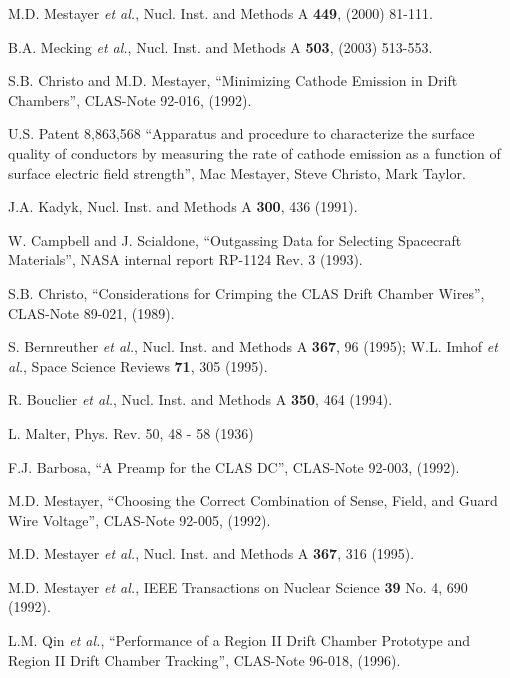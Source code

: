 \begin{thebibliography}{99}

\bibitem{}

 M.D. Mestayer {\it et al.}, Nucl. Inst. and Methods A {\bf 449}, (2000) 81-111.

 B.A. Mecking {\it et al.}, Nucl. Inst. and Methods A {\bf 503}, (2003) 513-553.

 S.B. Christo and M.D. Mestayer, ``Minimizing Cathode Emission in Drift 
Chambers'', CLAS-Note 92-016, (1992).

 U.S. Patent 8,863,568 ``Apparatus and procedure to characterize the surface quality 
of conductors by measuring the rate of cathode emission as a function of surface electric field 
strength'', Mac Mestayer, Steve Christo, Mark Taylor.

J.A. Kadyk, Nucl. Inst. and Methods A {\bf 300}, 436 (1991).

 W. Campbell and J. Scialdone, ``Outgassing Data for 
Selecting Spacecraft Materials'', NASA internal report RP-1124 Rev. 3 (1993).

 S.B. Christo, ``Considerations for Crimping the
CLAS Drift Chamber Wires'', CLAS-Note 89-021, (1989).

 S. Bernreuther {\it et al.}, Nucl. Inst. and Methods A {\bf 367}, 
96 (1995); W.L. Imhof {\it et al.}, Space Science Reviews {\bf 71}, 305 (1995).

 R. Bouclier {\it et al.}, Nucl. Inst. and Methods A {\bf 350}, 
464 (1994).

 L. Malter, Phys. Rev. 50, 48 - 58 (1936)

F.J. Barbosa, ``A Preamp for the CLAS DC'', CLAS-Note 92-003, (1992).

 M.D. Mestayer, ``Choosing the Correct 
Combination of Sense, Field, and Guard Wire Voltage'', CLAS-Note 
92-005, (1992).


M.D. Mestayer {\it et al.}, Nucl. Inst. and Methods A {\bf 367}, 316 (1995).

 M.D. Mestayer {\it et al.}, IEEE Transactions on Nuclear 
Science {\bf 39} No. 4, 690 (1992).

 L.M. Qin {\it et al.}, ``Performance of a Region II Drift Chamber Prototype and Region II Drift Chamber Tracking'', CLAS-Note 96-018, (1996).


\end{thebibliography}
